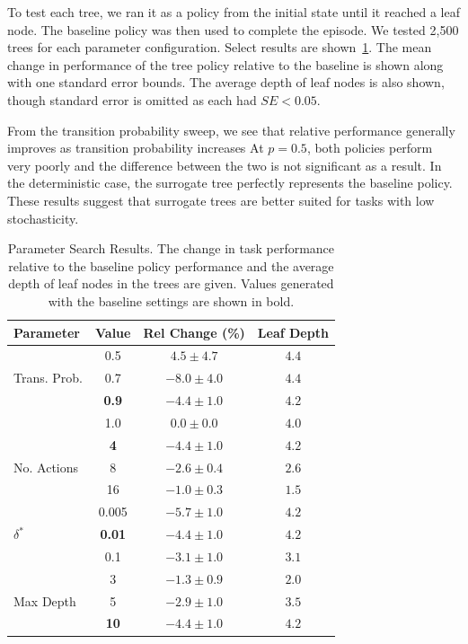 \documentclass[letterpaper]{article} %
\begin{document}
To test each tree, we ran it as a policy from the initial state until it reached a leaf node.
The baseline policy was then used to complete the episode.
We tested 2,500 trees for each parameter configuration.
Select results are shown~\cref{tab: grid results}.
The mean change in performance of the tree policy relative to the baseline is shown along with one standard error bounds.
The average depth of leaf nodes is also shown, though standard error is omitted as each had $SE < 0.05$.

From the transition probability sweep, we see that relative performance generally improves as transition probability increases
At $p=0.5$, both policies perform very poorly and the difference between the two is not significant as a result.
In the deterministic case, the surrogate tree perfectly represents the baseline policy.
These results suggest that surrogate trees are better suited for tasks with low stochasticity.
\begin{table}[t]
\centering
\begin{tabular}{@{}l c c c@{}}
\toprule
Parameter & Value & Rel Change (\%) & Leaf Depth \\
\midrule
\multirow[c]{3}{*}{Trans. Prob.} & 0.5 & $4.5 \pm 4.7$ & $4.4$ \\
& 0.7 & $-8.0 \pm 4.0$ & $4.4$ \\
& \textbf{0.9} & $\mathbf{-4.4 \pm 1.0}$ & $\mathbf{4.2}$ \\
& 1.0 & $0.0 \pm 0.0$ & $4.0$ \\
\midrule
\multirow[c]{3}{*}{No. Actions} & \textbf{4} & $\mathbf{-4.4 \pm 1.0}$ & $\mathbf{4.2}$ \\
& 8 & $-2.6 \pm 0.4$ & $2.6$ \\
& 16 & $-1.0 \pm 0.3$ & $1.5$ \\
\midrule
\multirow[c]{3}{*}{$\delta^*$} & 0.005 & $-5.7 \pm 1.0$ & $4.2$ \\
& \textbf{0.01} & $\mathbf{-4.4 \pm 1.0}$ & $\mathbf{4.2}$ \\
& 0.1 & $-3.1 \pm 1.0$ & $3.1$ \\
\midrule
\multirow[c]{3}{*}{Max Depth} & 3 & $-1.3 \pm 0.9$ & $2.0$ \\
& 5 & $-2.9 \pm 1.0$ & $3.5$ \\
& \textbf{10} & $\mathbf{-4.4 \pm 1.0}$ & $\mathbf{4.2}$ \\
\bottomrule
\end{tabular}
\caption{Parameter Search Results. The change in task performance relative to the baseline policy performance and the average depth of leaf nodes in the trees are given. Values generated with the baseline settings are shown in bold.}
\label{tab: grid results}
\end{table}
\end{document}
